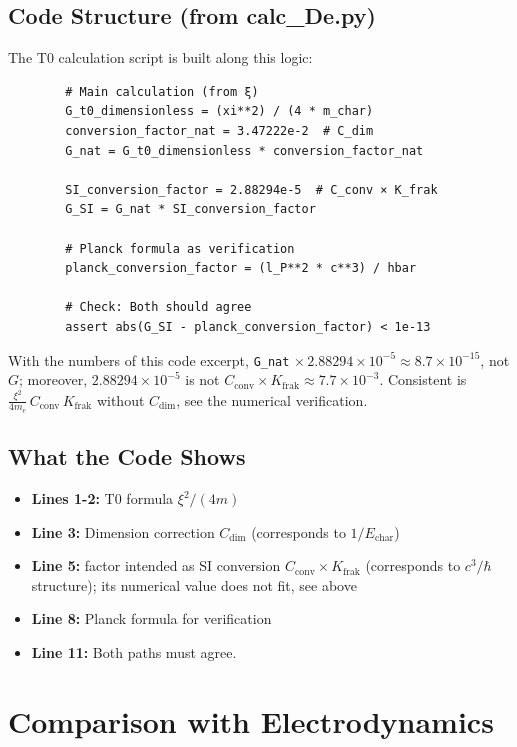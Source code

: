 	\subsection{Code Structure (from calc\_De.py)}
	
	The T0 calculation script is built along this logic:
	
	\begin{verbatim}
		# Main calculation (from ξ)
		G_t0_dimensionless = (xi**2) / (4 * m_char)
		conversion_factor_nat = 3.47222e-2  # C_dim
		G_nat = G_t0_dimensionless * conversion_factor_nat
		
		SI_conversion_factor = 2.88294e-5  # C_conv × K_frak
		G_SI = G_nat * SI_conversion_factor
		
		# Planck formula as verification
		planck_conversion_factor = (l_P**2 * c**3) / hbar
		
		# Check: Both should agree
		assert abs(G_SI - planck_conversion_factor) < 1e-13
	\end{verbatim}
	

	With the numbers of this code excerpt, \texttt{G\_nat} $\times\,2.88294\times10^{-5} \approx 8.7\times10^{-15}$, not $G$; moreover, $2.88294\times10^{-5}$ is not $C_{\text{conv}}\times K_{\text{frak}} \approx 7.7\times10^{-3}$. Consistent is $\frac{\xi^2}{4m_e}\,C_{\text{conv}}\,K_{\text{frak}}$ without $C_{\text{dim}}$, see the numerical verification.
	
	\subsection{What the Code Shows}
	
	\begin{itemize}
		\item \textbf{Lines 1-2:} T0 formula $\xi^2/(4m)$
		\item \textbf{Line 3:} Dimension correction $C_{\text{dim}}$ (corresponds to $1/E_{\text{char}}$)
		\item \textbf{Line 5:} factor intended as SI conversion $C_{\text{conv}} \times K_{\text{frak}}$ (corresponds to $c^3/\hbar$ structure); its numerical value does not fit, see above
		\item \textbf{Line 8:} Planck formula for verification
		\item \textbf{Line 11:} Both paths must agree.
	\end{itemize}
	
	\section{Comparison with Electrodynamics}
	
